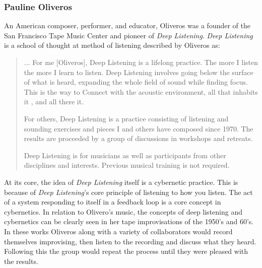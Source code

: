 \subsubsection{Pauline Oliveros} %
An American composer, performer, and educator, Oliveros was a founder of the San Francisco Tape Music Center and pioneer of\textit{ Deep Listening}\cite{HolmesElectronicMusic2020}. \textit{Deep Listening} is a school of thought at method of listening described by Oliveros as:

\begin{quote}
    ... For me [Oliveros], Deep Listening is a lifelong practice. The more I listen the more I learn to listen. Deep Listening involves going below the surface of what is heard, expanding the whole field of sound while finding focus. This is the way to Connect with the acoustic environment, all that inhabits it , and all there it.

    For others, Deep Listening is a practice consisting of listening and sounding exercises and pieces I and others have composed since 1970. The results are proceeded by a group of discussions in workshops and retreats. 

    Deep Listening is for musicians as well as participants from other disciplines and interests. Previous musical training is not required\cite{cultureandHumanity2002}.
\end{quote}

At its core, the idea of \textit{Deep Listening} itself is a cybernetic practice\cite{gordosOliverosCybernetics}. This is because of \textit{Deep Listening}'s core principle of listening to how you listen. The act of a system responding to itself in a feedback loop is a core concept in cybernetics. In relation to Olivero's music, the concepts of deep listening and cybernetics can be clearly seen in her tape improvisations of the 1950's and 60's. In these works Oliveros along with a variety of collaborators would record themselves improvising, then listen to the recording and discuss what they heard. Following this the group would repeat the process until they were pleased with the results\cite{gordosOliverosCybernetics}. 


